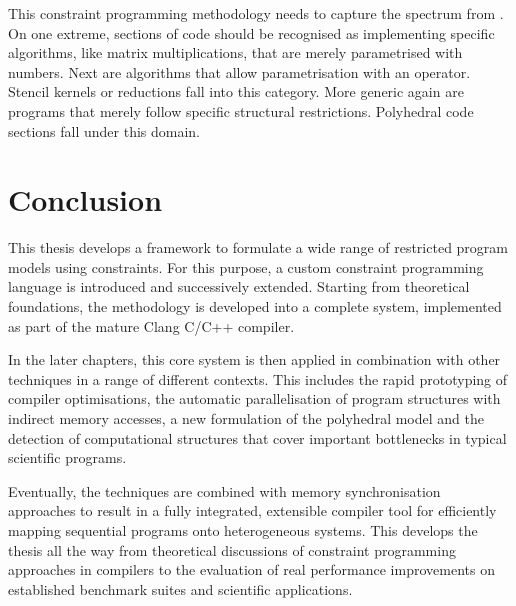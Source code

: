     This constraint programming methodology needs to capture the spectrum from
    .
    On one extreme, sections of code should be recognised as implementing
    specific algorithms, like matrix multiplications, that are merely
    parametrised with numbers.
    Next are algorithms that allow parametrisation with an operator.
    Stencil kernels or reductions fall into this category.
    More generic again are programs that merely follow specific structural
    restrictions.
    Polyhedral code sections fall under this domain.

\section{Conclusion}

    This thesis develops a framework to formulate a wide range of restricted
    program models using constraints.
    For this purpose, a custom constraint programming language is introduced
    and successively extended.
    Starting from theoretical foundations, the methodology is developed into
    a complete system, implemented as part of the mature Clang C/C++ compiler.

    In the later chapters, this core system is then applied in combination
    with other techniques in a range of different contexts.
    This includes the rapid prototyping of compiler optimisations, the
    automatic parallelisation of program structures with indirect memory
    accesses, a new formulation of the polyhedral model and the detection of
    computational structures that cover important bottlenecks in typical
    scientific programs.
    
    Eventually, the techniques are combined with memory synchronisation
    approaches to result in a fully integrated, extensible compiler tool for
    efficiently mapping sequential programs onto heterogeneous systems.
    This develops the thesis all the way from theoretical discussions of
    constraint programming approaches in compilers to the evaluation of real
    performance improvements on established benchmark suites and scientific
    applications.






